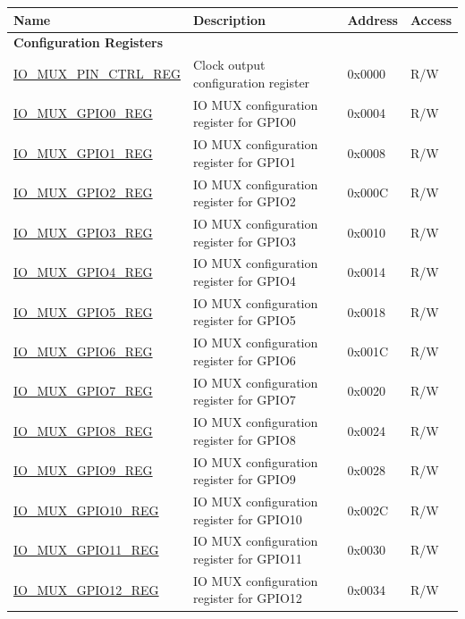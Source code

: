 \begin{longtable}{ | p{6cm} | p{7.6cm} | p{1.3cm} | p{1cm} | }
\hline\rowcolor{lightgray}
\textbf{Name} & \textbf{Description} &  \textbf{Address} & \textbf{Access} \\ \hline
\endhead
\multicolumn{4}{|l|}{\textbf{Configuration Registers}} \\ \hline
\hyperref[regdesc:IOMUXPINCTRLREG]{IO\_MUX\_PIN\_CTRL\_REG} & Clock output configuration register & 0x0000 & R/W \\ \hline
\hyperref[regdesc:IOMUXGPIONREG]{IO\_MUX\_GPIO0\_REG} & IO MUX configuration register for GPIO0 & 0x0004 & R/W \\ \hline
\hyperref[regdesc:IOMUXGPIONREG]{IO\_MUX\_GPIO1\_REG} & IO MUX configuration register for GPIO1 & 0x0008 & R/W \\ \hline
\hyperref[regdesc:IOMUXGPIONREG]{IO\_MUX\_GPIO2\_REG} & IO MUX configuration register for GPIO2 & 0x000C & R/W \\ \hline
\hyperref[regdesc:IOMUXGPIONREG]{IO\_MUX\_GPIO3\_REG} & IO MUX configuration register for GPIO3 & 0x0010 & R/W \\ \hline
\hyperref[regdesc:IOMUXGPIONREG]{IO\_MUX\_GPIO4\_REG} & IO MUX configuration register for GPIO4 & 0x0014 & R/W \\ \hline
\hyperref[regdesc:IOMUXGPIONREG]{IO\_MUX\_GPIO5\_REG} & IO MUX configuration register for GPIO5 & 0x0018 & R/W \\ \hline
\hyperref[regdesc:IOMUXGPIONREG]{IO\_MUX\_GPIO6\_REG} & IO MUX configuration register for GPIO6 & 0x001C & R/W \\ \hline
\hyperref[regdesc:IOMUXGPIONREG]{IO\_MUX\_GPIO7\_REG} & IO MUX configuration register for GPIO7 & 0x0020 & R/W \\ \hline
\hyperref[regdesc:IOMUXGPIONREG]{IO\_MUX\_GPIO8\_REG} & IO MUX configuration register for GPIO8 & 0x0024 & R/W \\ \hline
\hyperref[regdesc:IOMUXGPIONREG]{IO\_MUX\_GPIO9\_REG} & IO MUX configuration register for GPIO9 & 0x0028 & R/W \\ \hline
\hyperref[regdesc:IOMUXGPIONREG]{IO\_MUX\_GPIO10\_REG} & IO MUX configuration register for GPIO10 & 0x002C & R/W \\ \hline
\hyperref[regdesc:IOMUXGPIONREG]{IO\_MUX\_GPIO11\_REG} & IO MUX configuration register for GPIO11 & 0x0030 & R/W \\ \hline
\hyperref[regdesc:IOMUXGPIONREG]{IO\_MUX\_GPIO12\_REG} & IO MUX configuration register for GPIO12 & 0x0034 & R/W \\ \hline

\end{longtable}

